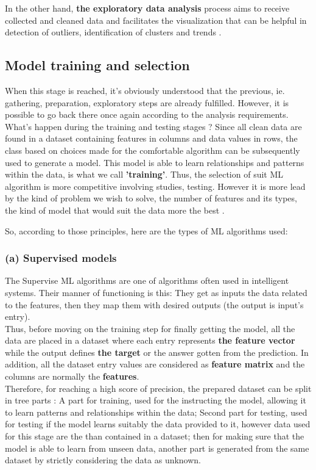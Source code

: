 \documentclass[12pt,a4paper, oneside]{book}
\begin{document}
In the other hand,\textbf{ the exploratory data analysis} process aims to receive collected and cleaned data and facilitates the visualization that can be helpful in detection of outliers, identification of clusters and trends \cite{unwin2020data}. 
\subsection{Model training and selection}
When this stage is reached, it's obviously understood that the previous, ie. gathering, preparation, exploratory steps are already fulfilled. However, it is possible to go back there once again according to the analysis requirements.
What's happen during the training and testing stages ?
Since all clean data are found in a dataset containing features in columns and data values in rows, the class based on choices made for the comfortable algorithm can be subsequently used to generate a model. This model is able to learn relationships and patterns within the data, is what we call \textbf{'training'}. 
Thus, the selection of suit ML algorithm is more competitive involving studies, testing. However it is more lead by the kind of problem we wish to solve, the number of features and its types, the kind of model that would suit the data more the best \cite{wang2016machine}. 

So, according to those principles, here are the types of ML algorithms used:


\subsubsection{(a) Supervised models}  
The Supervise ML algorithms are one of algorithms often  used in intelligent systems. Their manner of functioning is this: They get as inputs the data related to the features, then they map them  with desired outputs (the output is input's entry). \\

Thus, before moving on the training step for finally getting the model, all the data are placed in a dataset where each entry represents \textbf{the feature vector} while the output defines \textbf{the target} or the answer gotten from the prediction. In addition, all the dataset entry values are considered as \textbf{feature matrix} and the columns are normally the \textbf{features}. \\

Therefore, for reaching a high score of precision, the prepared dataset can be split in tree parts : A part for training, used for the instructing the model, allowing it to learn patterns and relationships within the data; Second part for testing, used for testing if the model learns suitably the data provided to it, however data used for this stage are the than contained in a dataset; then for making sure that the model is able to learn from unseen data, another part is generated from the same dataset by strictly considering the data as unknown. \\
\end{document}
